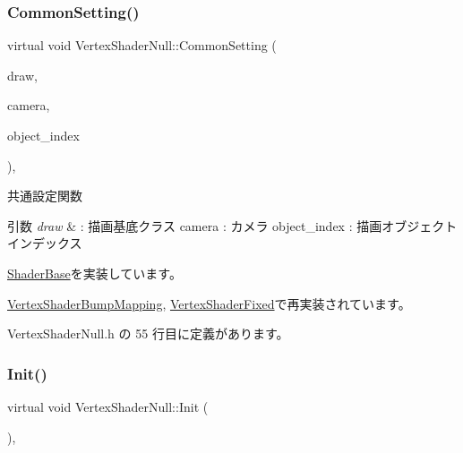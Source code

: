 \subsubsection{\texorpdfstring{Common\+Setting()}{CommonSetting()}}
{\footnotesize\ttfamily virtual void Vertex\+Shader\+Null\+::\+Common\+Setting (\begin{DoxyParamCaption}\item[{\mbox{\hyperlink{class_draw_base}{Draw\+Base}} $\ast$}]{draw,  }\item[{\mbox{\hyperlink{class_camera}{Camera}} $\ast$}]{camera,  }\item[{unsigned}]{object\+\_\+index }\end{DoxyParamCaption})\hspace{0.3cm}{\ttfamily [inline]}, {\ttfamily [virtual]}}



共通設定関数 


\begin{DoxyParams}{引数}
{\em draw} & \+: 描画基底クラス camera \+: カメラ object\+\_\+index \+: 描画オブジェクトインデックス \\
\hline
\end{DoxyParams}


\mbox{\hyperlink{class_shader_base_aef6fa922223d71fbec81464ebbfaf687}{Shader\+Base}}を実装しています。



\mbox{\hyperlink{class_vertex_shader_bump_mapping_a7979584d035fff86d386c99617a8dd2c}{Vertex\+Shader\+Bump\+Mapping}}, \mbox{\hyperlink{class_vertex_shader_fixed_a82bf2829b6fd0df26faedcbf650ba08d}{Vertex\+Shader\+Fixed}}で再実装されています。



 Vertex\+Shader\+Null.\+h の 55 行目に定義があります。

\mbox{\label{class_vertex_shader_null_af30eb8057fe0537bc6ade214647b6fb5}} 
\subsubsection{\texorpdfstring{Init()}{Init()}}
{\footnotesize\ttfamily virtual void Vertex\+Shader\+Null\+::\+Init (\begin{DoxyParamCaption}{ }\end{DoxyParamCaption})\hspace{0.3cm}{\ttfamily [inline]}, {\ttfamily [virtual]}}



